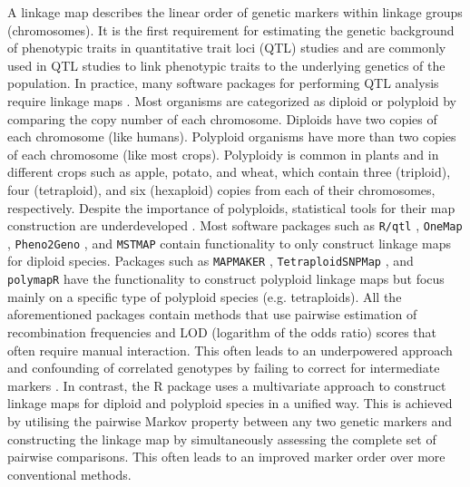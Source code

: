 A linkage map describes the linear order of genetic markers within linkage groups (chromosomes). It is the first requirement for estimating the genetic background of phenotypic traits in quantitative trait loci (QTL) studies and are commonly used in QTL studies to link phenotypic traits to the underlying genetics of the population. In practice, many software packages for performing QTL analysis require linkage maps \citep{lander1987mapmaker, broman2003r, yang2008qtlnetwork, taylor2011r, huang2012dlmap, broman2019r}. 
Most organisms are categorized as diploid or polyploid by comparing the copy number of each chromosome. Diploids have two copies of each chromosome (like humans). Polyploid organisms have more than two copies of each chromosome (like most crops). Polyploidy is common in plants and in different crops such as apple, potato, and wheat, which contain three (triploid), four (tetraploid), and six (hexaploid) copies from each of their chromosomes, respectively. Despite the importance of polyploids, statistical tools for their map construction are underdeveloped \citep{grandke2017pergola, bourke2018polymapr}. Most software packages such as {\tt R/qtl} \citep{broman2003r}, {\tt OneMap} \citep{margarido2007onemap}, {\tt Pheno2Geno} \citep{zych2015pheno2geno}, and {\tt MST{\scriptsize MAP}} \citep{wu2008efficient, taylor2017r} contain functionality to only construct linkage maps for diploid species. Packages such as {\tt MAPMAKER} \citep{lander1987mapmaker}, {\tt TetraploidSNPMap} \citep{hackett2017tetraploidsnpmap}, and {\tt polymapR} \citep{bourke2018polymapr} have the functionality to construct polyploid linkage maps but focus mainly on a specific type of polyploid species (e.g. tetraploids). All the aforementioned packages contain methods that use pairwise estimation of recombination frequencies and LOD (logarithm of the odds ratio) scores \citep{wang2016potential} that often require manual interaction. This often leads to an underpowered approach and confounding of correlated genotypes by failing to correct for intermediate markers \citep{behrouzi2019novo}. In contrast, the  R package uses a multivariate approach to construct linkage maps for diploid and polyploid species in a unified way. This is achieved by utilising the pairwise Markov property between any two genetic markers and constructing the linkage map by simultaneously assessing the complete set of pairwise comparisons. This often leads to an improved marker order over more conventional methods.
